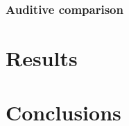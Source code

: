 \documentclass[11pt,twoside,a4paper]{report}
\begin{document}
\subsection{Auditive comparison}


\chapter{Results}
\chapter{Conclusions}

%
%
\cleardoublepage
  


\cleardoublepage
\end{document}
